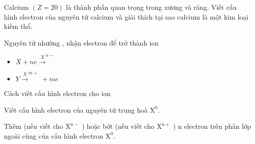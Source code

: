 \begin{vdex}
	Calcium $(Z=20)$ là thành phần quan trọng trong xương và răng. Viết cấu hình electron của nguyên tử calcium và giải thích tại sao calcium là một kim loại kiềm thổ.
\end{vdex}
\begin{pp}
	Nguyên tử nhường , nhận electron để trở thành ion
	\begin{itemize}
		\item $X + ne \xrightarrow X^{n-}$
		\item $Y  \xrightarrow X^{m+} + me$
	\end{itemize}
	Cách viết cấu hình electron cho ion 
	\begin{cacbuoc}
		\item  Viết cấu hình electron của nguyên tử trung hoà $\mathrm{X}^0$.
		\item Thêm (nếu viết cho $\mathrm{X}^{\mathrm{n-}}$ ) hoặc bớt (nếu viết cho $\mathrm{X}^{\mathrm{n+}}$ ) n electron trên phân lớp ngoài cùng của cấu hình electron $\mathrm{X}^0$.
	\end{cacbuoc}
\end{pp}

